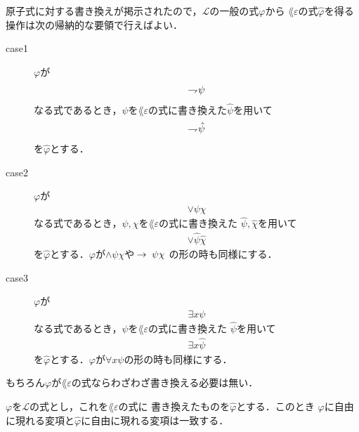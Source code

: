 	原子式に対する書き換えが掲示されたので，$\mathcal{L}$の一般の式$\varphi$から
	$\lang{\varepsilon}$の式$\hat{\varphi}$を得る操作は次の帰納的な要領で行えばよい．
	\begin{description}
		\item[case1] $\varphi$が
			\begin{align}
				\rightharpoondown\hspace{-0.25em} \psi
			\end{align}
			なる式であるとき，$\psi$を$\lang{\varepsilon}$の式に書き換えた$\hat{\psi}$を用いて
			\begin{align}
				\rightharpoondown\hspace{-0.25em} \hat{\psi}
			\end{align}
			を$\hat{\varphi}$とする．
			
		\item[case2] $\varphi$が
			\begin{align}
				\vee \psi \chi
			\end{align}
			なる式であるとき，$\psi,\chi$を$\lang{\varepsilon}$の式に書き換えた
			$\hat{\psi},\hat{\chi}$を用いて
			\begin{align}
				\vee \hat{\psi} \hat{\chi}
			\end{align}
			を$\hat{\varphi}$とする．$\varphi$が$\wedge \psi \chi$や$\hspace{0.25em}\rightarrow\hspace{0.25em} \psi \chi$
			の形の時も同様にする．
			
		\item[case3] $\varphi$が
			\begin{align}
				\exists x \psi
			\end{align}
			なる式であるとき，$\psi$を$\lang{\varepsilon}$の式に書き換えた
			$\hat{\psi}$を用いて
			\begin{align}
				\exists x \hat{\psi}
			\end{align}
			を$\hat{\varphi}$とする．$\varphi$が$\forall x \psi$の形の時も同様にする．
	\end{description}
	
	もちろん$\varphi$が$\lang{\varepsilon}$の式ならわざわざ書き換える必要は無い．
	
	\begin{screen}
		\begin{metathm}[書き換え後も自由な変項は増減しない]
			$\varphi$を$\mathcal{L}$の式とし，これを$\lang{\varepsilon}$の式に
			書き換えたものを$\hat{\varphi}$とする．このとき
			$\varphi$に自由に現れる変項と$\hat{\varphi}$に自由に現れる変項は一致する．
		\end{metathm}
	\end{screen}
	
